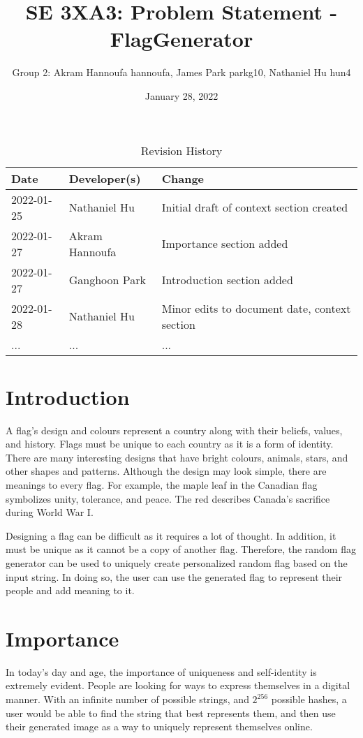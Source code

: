 \documentclass[12pt, letterpaper]{article}
\title{SE 3XA3: Problem Statement - FlagGenerator}
\author{Group 2: Akram Hannoufa \- hannoufa, James Park \- parkg10, Nathaniel Hu \- hun4
}
\date{January 28, 2022}
\begin{document}
\begin{table}[hp]
\caption{Revision History} \label{TblRevisionHistory}
\begin{tabularx}{\textwidth}{llX}
\toprule
\textbf{Date} & \textbf{Developer(s)} & \textbf{Change}\\
\midrule
2022-01-25 & Nathaniel Hu & Initial draft of context section created \\
2022-01-27 & Akram Hannoufa & Importance section added \\
2022-01-27 & Ganghoon Park & Introduction section added \\
2022-01-28 & Nathaniel Hu & Minor edits to document date, context section \\
... & ... & ...\\
\bottomrule
\end{tabularx}
\end{table}

\newpage
\maketitle

\section{Introduction}
A flag’s design and colours represent a country along with their beliefs, values, and history. Flags must be unique to each country as it is a form of identity. There are many interesting designs that have bright colours, animals, stars, and other shapes and patterns. Although the design may look simple, there are meanings to every flag. For example, the maple leaf in the Canadian flag symbolizes unity, tolerance, and peace. The red describes Canada’s sacrifice during World War I.

Designing a flag can be difficult as it requires a lot of thought. In addition, it must be unique as it cannot be a copy of another flag. Therefore, the random flag generator can be used to uniquely create personalized random flag based on the input string. In doing so, the user can use the generated flag to represent their people and add meaning to it.


\section{Importance}
In today’s day and age, the importance of uniqueness and self-identity is extremely evident. People are looking for ways to express themselves in a digital manner. With an infinite number of possible strings, and $2^{256}$ possible hashes, a user would be able to find the string that best represents them, and then use their generated image as a way to uniquely represent themselves online.
\end{document}
